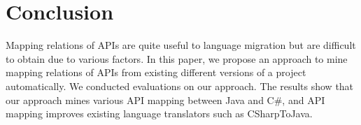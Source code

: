\section{Conclusion}
\label{sec:colcusion} Mapping relations of APIs are quite useful to
language migration but are difficult to obtain due to various
factors. In this paper, we propose an approach to mine mapping
relations of APIs from existing different versions of a project
automatically. We conducted evaluations on our approach. The results
show that our approach mines various API mapping between Java and
C\#, and API mapping improves existing language translators such as
CSharpToJava.
